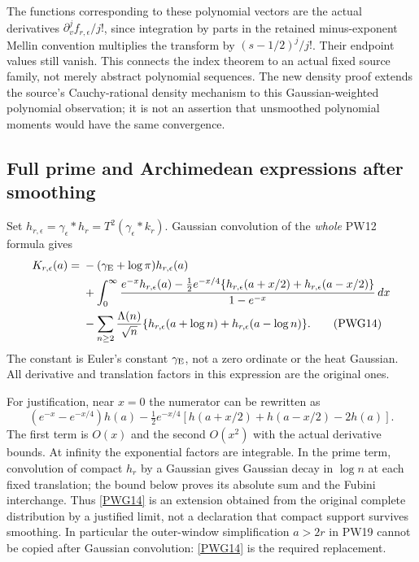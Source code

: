 The functions corresponding to these polynomial vectors are the actual derivatives $\partial_v^j f_{r,\epsilon}/j!$, since integration by parts in the retained minus-exponent Mellin convention multiplies the transform by $(s-1/2)^j/j!$. Their endpoint values still vanish. This connects the index theorem to an actual fixed source family, not merely abstract polynomial sequences. The new density proof extends the source's Cauchy-rational density mechanism to this Gaussian-weighted polynomial observation; it is not an assertion that unsmoothed polynomial moments would have the same convergence.

\subsection{Full prime and Archimedean expressions after smoothing}
Set $h_{r,\epsilon}=\gamma_\epsilon*h_r=T^2(\gamma_\epsilon*k_r)$. Gaussian convolution of the \emph{whole} PW12 formula gives
\begin{align}
 K_{r,\epsilon}(a)={}&-(\gamma_{\rm E}+\log\pi)h_{r,\epsilon}(a)\notag\\
 &+\int_0^\infty\frac{e^{-x}h_{r,\epsilon}(a)
   -\tfrac12e^{-x/4}\{h_{r,\epsilon}(a+x/2)+h_{r,\epsilon}(a-x/2)\}}
                       {1-e^{-x}}\,dx\notag\\
 &-\sum_{n\ge2}\frac{\Lambda(n)}{\sqrt n}
       \{h_{r,\epsilon}(a+\log n)+h_{r,\epsilon}(a-\log n)\}.
                                                               \tag{PWG14}\label{PWG14}
\end{align}
The constant is Euler's constant $\gamma_{\rm E}$, not a zero ordinate or the heat Gaussian. All derivative and translation factors in this expression are the original ones.

For justification, near $x=0$ the numerator can be rewritten as
\[
 (e^{-x}-e^{-x/4})h(a)
 -\tfrac12e^{-x/4}[h(a+x/2)+h(a-x/2)-2h(a)].
\]
The first term is $O(x)$ and the second $O(x^2)$ with the actual derivative bounds. At infinity the exponential factors are integrable. In the prime term, convolution of compact $h_r$ by a Gaussian gives Gaussian decay in $\log n$ at each fixed translation; the bound below proves its absolute sum and the Fubini interchange. Thus \eqref{PWG14} is an extension obtained from the original complete distribution by a justified limit, not a declaration that compact support survives smoothing. In particular the outer-window simplification $a>2r$ in PW19 cannot be copied after Gaussian convolution: \eqref{PWG14} is the required replacement.

